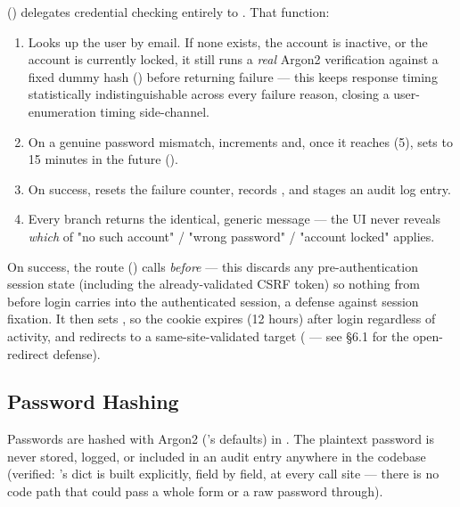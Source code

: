  () delegates credential
checking entirely to . That function:

\begin{enumerate}[nosep]
  \item Looks up the user by email. If none exists, the account is
        inactive, or the account is currently locked, it still runs a
        \emph{real} Argon2 verification against a fixed dummy hash
        () before returning
        failure --- this keeps response timing statistically
        indistinguishable across every failure reason, closing a
        user-enumeration timing side-channel.
  \item On a genuine password mismatch, increments
         and, once it reaches
         (5), sets
         to 15 minutes in the future
        ().
  \item On success, resets the failure counter, records
        , and stages an audit log entry.
  \item Every branch returns the identical, generic
         message --- the UI never
        reveals \emph{which} of "no such account" / "wrong password" /
        "account locked" applies.
\end{enumerate}

On success, the route () calls
 \emph{before}  --- this
discards any pre-authentication session state (including the
already-validated CSRF token) so nothing from before login carries into
the authenticated session, a defense against session fixation. It then
sets , so the cookie expires
 (12 hours) after login regardless of
activity, and redirects to a same-site-validated  target
( --- see \S6.1
for the open-redirect defense).

\subsection*{Password Hashing}

Passwords are hashed with Argon2 ('s
defaults) in . The plaintext password is
never stored, logged, or included in an audit entry anywhere in the
codebase (verified: 's  dict
is built explicitly, field by field, at every call site --- there is no
code path that could pass a whole form or a raw password through).

